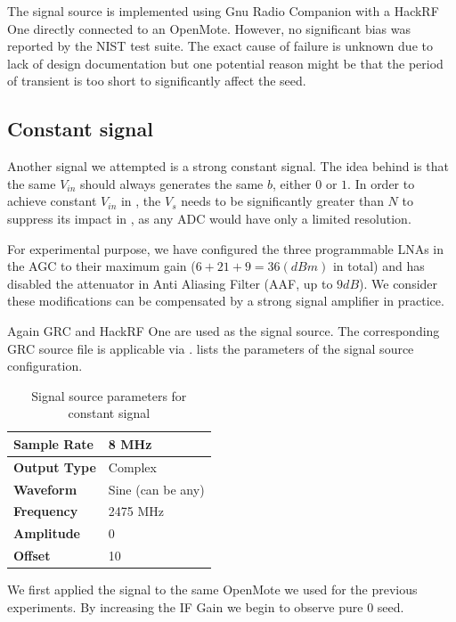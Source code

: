 The signal source is implemented using Gnu Radio Companion\cite{GRC} with a HackRF One\cite{HackRFOne} directly connected to an OpenMote\cite{OpenMote}. However, no significant bias was reported by the NIST test suite. The exact cause of failure is unknown due to lack of design documentation but one potential reason might be that the period of transient is too short to significantly affect the seed.

\subsection{Constant signal} \label{Constant}
Another signal we attempted is a strong constant signal. The idea behind is that the same $V_{in}$ should always generates the same $b$, either $0$ or $1$. In order to achieve constant $V_{in}$ in , the $V_s$ needs to be significantly greater than $N$ to suppress its impact in , as any ADC would have only a limited resolution.

For experimental purpose, we have configured the three programmable LNAs in the AGC to their maximum gain ($6 + 21 + 9 = 36(dBm)$ in total) and has disabled the attenuator in Anti Aliasing Filter (AAF, up to $9dB$). We consider these modifications can be compensated by a strong signal amplifier in practice.

Again GRC and HackRF One are used as the signal source. The corresponding GRC source file is applicable via \cite{prngtest}.  lists the parameters of the signal source configuration.

\begin{table}[!t]
\caption{Signal source parameters for constant signal}
\label{ConstantSignal}
\centering
\begin{tabular}{|l|l|}
\hline
\textbf{Sample Rate} & 8 MHz             \\ \hline
\textbf{Output Type} & Complex           \\ \hline
\textbf{Waveform}    & Sine (can be any) \\ \hline
\textbf{Frequency}   & 2475 MHz          \\ \hline
\textbf{Amplitude}   & 0                 \\ \hline
\textbf{Offset}      & 10                \\ \hline
\end{tabular}
\end{table}

We first applied the signal to the same OpenMote we used for the previous experiments. By increasing the IF Gain we begin to observe pure $0$ seed.

